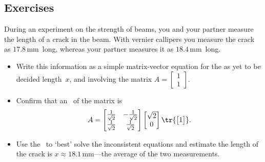 






\subsection{Exercises}


\begin{exercise} \label{ex:} 
During an experiment on the strength of beams, you and your partner measure the length of a crack in the beam.
With vernier callipers you measure the crack as \(17.8\)\,mm~long, whereas your partner measures it as \(18.4\)\,mm~long.
\begin{itemize}
\item Write this information as a simple matrix-vector equation for the as yet to be decided length~\(x\), and involving the matrix \(A=\begin{bmatrix} 1\\1 \end{bmatrix}\).
\item Confirm that an \svd\ of the matrix is
\begin{equation*}
A=\begin{bmatrix} \frac1{\sqrt2}&-\frac1{\sqrt2}
\\\frac1{\sqrt2}&\frac1{\sqrt2} \end{bmatrix}
\begin{bmatrix} \sqrt2\\0 \end{bmatrix}
\tr{\begin{bmatrix} 1 \end{bmatrix}}.
\end{equation*}
\item Use the \svd\ to `best' solve the inconsistent equations and estimate the length of the crack is \(x\approx 18.1\)\,mm---the average of the two measurements.
\end{itemize}
\end{exercise}



